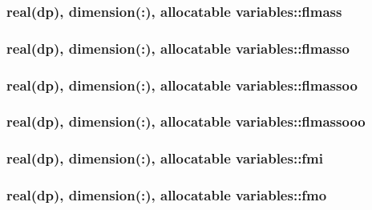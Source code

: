 \hypertarget{classvariables_a785014a6b534cef9da96697952e877ea}{
\subsubsection[{flmass}]{\setlength{\rightskip}{0pt plus 5cm}real(dp), dimension(\-:), allocatable variables\-::flmass}}\label{classvariables_a785014a6b534cef9da96697952e877ea}
\hypertarget{classvariables_ab2aeaa8c9334d39e39a8c0830e501759}{
\subsubsection[{flmasso}]{\setlength{\rightskip}{0pt plus 5cm}real(dp), dimension(\-:), allocatable variables\-::flmasso}}\label{classvariables_ab2aeaa8c9334d39e39a8c0830e501759}
\hypertarget{classvariables_a947f8f15a029a013d7ec18f0af476c2a}{
\subsubsection[{flmassoo}]{\setlength{\rightskip}{0pt plus 5cm}real(dp), dimension(\-:), allocatable variables\-::flmassoo}}\label{classvariables_a947f8f15a029a013d7ec18f0af476c2a}
\hypertarget{classvariables_aa647a7a6f42f6b652dcf8c2e61e520cb}{
\subsubsection[{flmassooo}]{\setlength{\rightskip}{0pt plus 5cm}real(dp), dimension(\-:), allocatable variables\-::flmassooo}}\label{classvariables_aa647a7a6f42f6b652dcf8c2e61e520cb}
\hypertarget{classvariables_a2e685aca274cbe74ce02b945c6210f0c}{
\subsubsection[{fmi}]{\setlength{\rightskip}{0pt plus 5cm}real(dp), dimension(\-:), allocatable variables\-::fmi}}\label{classvariables_a2e685aca274cbe74ce02b945c6210f0c}
\hypertarget{classvariables_a9ab32f17a2c20b8dd5d11af27d58584c}{
\subsubsection[{fmo}]{\setlength{\rightskip}{0pt plus 5cm}real(dp), dimension(\-:), allocatable variables\-::fmo}}\label{classvariables_a9ab32f17a2c20b8dd5d11af27d58584c}
